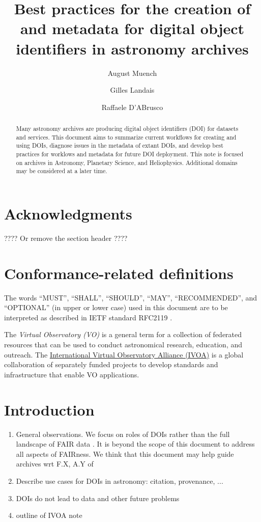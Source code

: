 \documentclass[11pt,a4paper]{ivoa}
\title{Best practices for the creation of and metadata for digital object identifiers in astronomy archives}
\author[https://orcid.org/0000-0003-0666-6367]{August Muench}
\author[]{Gilles Landais}
\author[]{Raffaele D'ABrusco}
\begin{document}

\begin{abstract}
Many astronomy archives are producing digital object identifiers (DOI) for datasets and services.
This document aims to summarize current workflows for creating and using DOIs, 
diagnose issues in the metadata of extant DOIs, 
and develop best practices for worklows and metadata for future DOI deployment.
This note is focused on archives in Astronomy, Planetary Science, and Heliophysics. 
Additional domains may be considered at a later time.
\end{abstract}


\section*{Acknowledgments}

???? Or remove the section header ????

\section*{Conformance-related definitions}

The words ``MUST'', ``SHALL'', ``SHOULD'', ``MAY'', ``RECOMMENDED'', and
``OPTIONAL'' (in upper or lower case) used in this document are to be
interpreted as described in IETF standard RFC2119 \citep{std:RFC2119}.

The \emph{Virtual Observatory (VO)} is a
general term for a collection of federated resources that can be used
to conduct astronomical research, education, and outreach.
The \href{https://www.ivoa.net}{International
Virtual Observatory Alliance (IVOA)} is a global
collaboration of separately funded projects to develop standards and
infrastructure that enable VO applications.


\section{Introduction}

\begin{enumerate}
\item General observations. 
We focus on roles of DOIs rather than the full landscape of FAIR data \citep[e.g.,][]{Wilkinson2016}. 
It is beyond the scope of this document to address all aspects of FAIRness.
We think that this document may help guide archives wrt F.X, A.Y of 
\item Describe use cases for DOIs in astronomy: citation, provenance, ...
\item DOIs do not lead to data and other future problems
\item outline of IVOA note
\end{enumerate}
\end{document}
